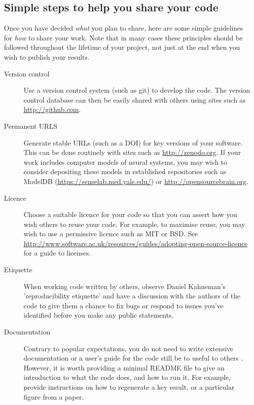 \documentclass[11pt]{article}
\begin{document}
\subsection*{Simple steps to help you share your code}

Once you have decided \textit{what} you plan to share, here are some simple
guidelines for \textit{how} to share your work.  Note that in many cases these
principles should be followed throughout the lifetime of your project,
not just at the end when you wish to publish your results.

\begin{description}
\item [Version control] Use a version control system (such as git) to
  develop the code.  The version control database can then be easily
  shared with others using sites such as \url{http://github.com}.

\item [Permanent URLS] Generate stable URLs (such as a DOI) for key
  versions of your software.  This can be done routinely with sites
  such as \url{http://zenodo.org}.  If your work includes computer
  models of neural systems, you may wish to consider depositing these
  models in established repositories such as ModelDB
  (\url{https://senselab.med.yale.edu/}) or
  \url{http://opensourcebrain.org}.


\item [Licence] Choose a suitable licence for your code so that you
  can assert how you wish others to reuse your code.  For example, to
  maximise reuse, you may wish to use a permissive licence such as
  MIT or BSD.  See
  \url{http://www.software.ac.uk/resources/guides/adopting-open-source-licence}
  for a guide to licenses.

\item [Etiquette] When working code written by others, observe Daniel Kahneman's
  'reproducibility etiquette' and have a discussion with the authors
  of the code to give them a chance to fix bugs or respond to issues
  you've identified before you make any public statements.

\item [Documentation] Contrary to popular expectations, you do not
  need to write extensive documentation or a user's guide for the code
  still be to useful to others \cite{Barnes2010-iv}.  However, it is
  worth providing a minimal README file to give an introduction to
  what the code does, and how to run it.  For example, provide
  instructions on how to regenerate a key result, or a particular
  figure from a paper.


\end{description}
\end{document}
